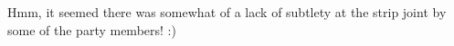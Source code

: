 Hmm, it seemed there was somewhat of a lack of subtlety at the strip joint by some of the party members! :)\\


